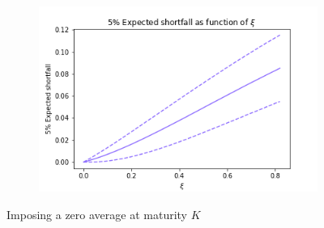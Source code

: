 \documentclass{article}
\begin{document}
\begin{figure}[b!]
\begin{subfigure}[b]{\textwidth}
         \includegraphics[scale=.7]{png/expected_shortfall_W0=1_r=0.0004166666666666667_m=0.02592451988463669_sigma=0.06164058158266796_K=24_S=100000.png}
         \caption{}
         \label{fig:average-final-wealth-zero-expected-shortfall}
     \end{subfigure}
        \caption{Imposing a zero average at maturity $K$}
        \label{fig:fixed-maturity}
\end{figure}
\end{document}
